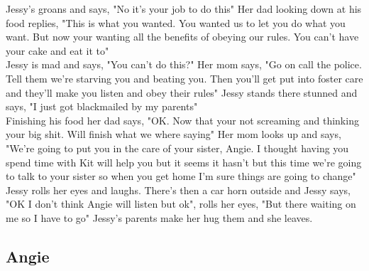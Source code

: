 \documentclass{article}[12px]
\begin{document}
	Jessy's groans and says, "No it's your job to do this" Her dad looking down at his food replies, "This is what you wanted. You wanted us to let you do what you want. But now your wanting all the benefits of obeying our rules. You can't have your cake and eat it to"\\
	
	Jessy is mad and says, "You can't do this?" Her mom says, "Go on call the police. Tell them we're starving you and beating you. Then you'll get put into foster care and they'll make you listen and obey their rules" Jessy stands there stunned and says, "I just got blackmailed by my parents"\\
	
	Finishing his food her dad says, "OK. Now that your not screaming and thinking your big shit. Will finish what we where saying" Her mom looks up and says, "We're going to put you in the care of your sister, Angie. I thought having you spend time with Kit will help you but it seems it hasn't but this time we're going to talk to your sister so when you get home I'm sure things are going to change" Jessy rolls her eyes and laughs. There's then a car horn outside and Jessy says, "OK I don't think Angie will listen but ok", rolls her eyes, "But there waiting on me so I have to go" Jessy's parents make her hug them and she leaves.\\
\subsection* {Angie}
	
\end{document}
